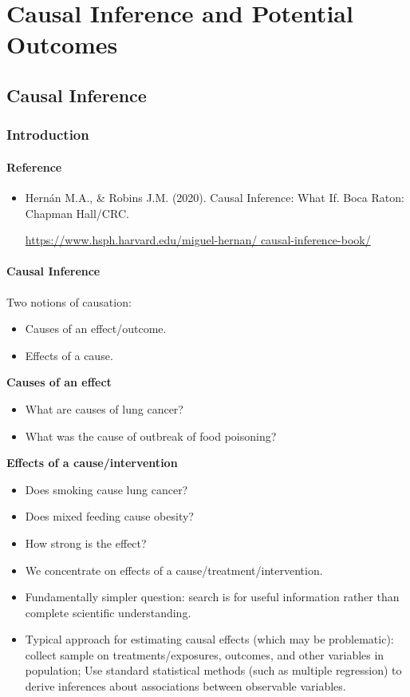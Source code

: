 \chapter{Causal Inference and Potential Outcomes}
\section{Causal Inference}
\subsection{Introduction}
\subsubsection{Reference}
\begin{itemize}
    \item Hernán M.A., \& Robins J.M. (2020). Causal Inference: What
          If. Boca Raton: Chapman Hall/CRC\@.

          \url{https://www.hsph.harvard.edu/miguel-hernan/
              causal-inference-book/}
\end{itemize}
\subsubsection{Causal Inference}
Two notions of causation:
\begin{itemize}
    \item Causes of an effect/outcome.
    \item Effects of a cause.
\end{itemize}
\textbf{Causes of an effect}
\begin{itemize}
    \item What are causes of lung cancer?
    \item What was the cause of outbreak of food poisoning?
\end{itemize}
\textbf{Effects of a cause/intervention}
\begin{itemize}
    \item Does smoking cause lung cancer?
    \item Does mixed feeding cause obesity?
    \item How strong is the effect?
\end{itemize}
\begin{itemize}
    \item We concentrate on effects of a cause/treatment/intervention.
    \item Fundamentally simpler question: search is for useful
          information rather than complete scientific understanding.
    \item Typical approach for estimating causal effects (which may be
          problematic):
          collect sample on treatments/exposures, outcomes, and other
          variables in population; Use standard statistical methods
          (such as multiple regression) to derive inferences about
          associations between observable variables.
\end{itemize}
